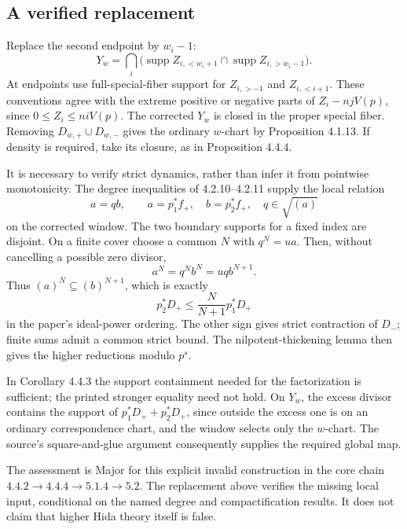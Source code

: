 \documentclass[10pt]{article}
\begin{document}
\subsection*{A verified replacement}
Replace the second endpoint by \(w_i-1\): \[Y_w=\bigcap_i
 \bigl(\operatorname{supp}Z_{i,<w_i+1}\cap\operatorname{supp}Z_{i,>w_i-1}\bigr).\] At endpoints use full-special-fiber support for \(Z_{i,>-1}\) and \(Z_{i,<i+1}\). These conventions agree with the extreme positive or negative parts of \(Z_i-njV(p)\), since \(0\leq Z_i\leq niV(p)\). The corrected \(Y_w\) is closed in the proper special fiber. Removing \(D_{w,+}\cup D_{w,-}\) gives the ordinary \(w\)-chart by Proposition 4.1.13. If density is required, take its closure, as in Proposition 4.4.4.\par
It is necessary to verify strict dynamics, rather than infer it from pointwise monotonicity. The degree inequalities of 4.2.10–4.2.11 supply the local relation \[a=q b,\qquad a=p_1^*f_+,\quad b=p_2^*f_+,\quad
 q\in\sqrt{(a)}\] on the corrected window. The two boundary supports for a fixed index are disjoint. On a finite cover choose a common \(N\) with \(q^N=u a\). Then, without cancelling a possible zero divisor, \[a^N=q^Nb^N=u q b^{N+1}.\] Thus \((a)^N\subseteq(b)^{N+1}\), which is exactly \[p_2^*D_+\leq \frac{N}{N+1}p_1^*D_+\] in the paper’s ideal-power ordering. The other sign gives strict contraction of \(D_-\); finite sums admit a common strict bound. The nilpotent-thickening lemma then gives the higher reductions modulo \(p^s\).\par
In Corollary 4.4.3 the support containment needed for the factorization is sufficient; the printed stronger equality need not hold. On \(Y_w\), the excess divisor contains the support of \(p_1^*D_++p_2^*D_+\), since outside the excess one is on an ordinary correspondence chart, and the window selects only the \(w\)-chart. The source’s square-and-glue argument consequently supplies the required global map.\par
The assessment is Major for this explicit invalid construction in the core chain \(4.4.2\to4.4.4\to5.1.4\to5.2\). The replacement above verifies the missing local input, conditional on the named degree and compactification results. It does not claim that higher Hida theory itself is false.\par
\end{document}
